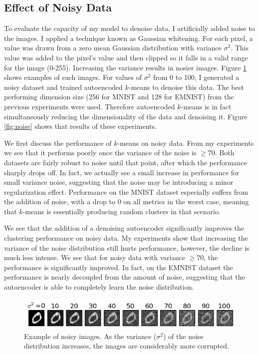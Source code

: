 \subsection{Effect of Noisy Data}
To evaluate the capacity  of my model to denoise data, I artificially added noise to the images. I applied a technique known as Gaussian whitening. For each pixel, a value was drawn from a zero mean Gaussian distribution with variance $\sigma^2$. This value was added to the pixel's value and then clipped so it falls in a valid range for the image (0-255). Increasing the variance results in nosier images. Figure \ref{fig:noisy} shows examples of such images. For values of $\sigma^2$ from 0 to 100, I generated a noisy dataset and trained autoencoded $k$-means to denoise this data. The best performing dimension size (256 for MNIST and 128 for EMNIST) from the previous experiments were used. Therefore autoencoded $k$-means is in fact simultaneously reducing the dimensionality of the data and denoising it. Figure \ref{fig:noise} shows that results of these experiments.

We first discuss the performance of $k$-means on noisy data. From my experiments we see that it performs poorly once the variance of the noise is $\geq 70$.  Both datasets are fairly robust to noise until that point, after which the performance sharply drops off.  In fact, we actually see a small increase in performance for small variance noise, suggesting that the noise may be introducing a minor regularization effect. Performance on the MNIST dataset especially suffers from the addition of noise, with a drop to 0 on all metrics in the worst case, meaning that $k$-means is essentially producing random clusters in that scenario.

We see that the addition of a denoising autoencoder significantly improves the clustering performance on noisy data. My experiments show that increasing the variance of the noise distribution still hurts performance, however, the decline is much less intense. We see that for noisy data with variance $\geq 70$, the performance is significantly improved. In fact, on the EMNIST dataset the performance is nearly decoupled from the amount of noise, suggesting that the autoencoder is able to completely learn the noise distribution. 

\begin{figure}
	\centering
	\includegraphics[width=\textwidth]{figs/noisy_row.png}
	\caption{Example of noisy images. As the variance ($\sigma^2$) of the noise distribution increases, the images are considerably more corrupted.}
	\label{fig:noisy}
\end{figure}

